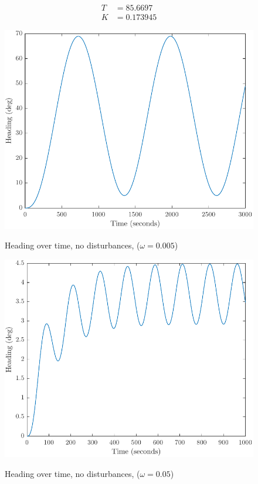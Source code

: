 \begin{align*}
    T &= 85.6697 \\
    K &= 0.173945
\end{align*}

\begin{figure}[ht]
    \centering
    \begin{minipage}[b]{0.48\textwidth}
        \includegraphics[width=\textwidth]{"images/1b-omega_lik_0005"}
        \label{fig:1b-omega=0.0005}
        \caption{Heading over time, no disturbances, ($\omega = 0.005$)}
    \end{minipage}
    \hfill
    \begin{minipage}[b]{0.48\textwidth}
        \includegraphics[width=\textwidth]{"images/1b-omega_lik_005"}
        \label{fig:1b-omega=0.005}
        \caption{Heading over time, no disturbances, ($\omega = 0.05$)}
    \end{minipage}
\end{figure}

